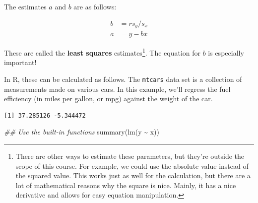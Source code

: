 \documentclass[
  letterpaper,
  DIV=11,
  numbers=noendperiod,
  oneside]{scrreprt}
\newenvironment{Shaded}{\begin{snugshade}}{\end{snugshade}}
\newcommand{\DocumentationTok}[1]{\textcolor[rgb]{0.37,0.37,0.37}{\textit{#1}}}
\newcommand{\FunctionTok}[1]{\textcolor[rgb]{0.28,0.35,0.67}{#1}}
\newcommand{\NormalTok}[1]{\textcolor[rgb]{0.00,0.23,0.31}{#1}}
\newcommand{\OtherTok}[1]{\textcolor[rgb]{0.00,0.23,0.31}{#1}}
\newcommand{\SpecialCharTok}[1]{\textcolor[rgb]{0.37,0.37,0.37}{#1}}
\begin{document}
The estimates \(a\) and \(b\) are as follows:

\begin{align*}
b &= rs_y/s_x\\
a &= \bar y - b\bar x
\end{align*}

These are called the \textbf{least squares} estimates\footnote{There are
  other ways to estimate these parameters, but they're outside the scope
  of this course. For example, we could use the absolute value instead
  of the squared value. This works just as well for the calculation, but
  there are a lot of mathematical reasons why the square is nice.
  Mainly, it has a nice derivative and allows for easy equation
  manipulation.}. The equation for \(b\) is especially important!

In R, these can be calculated as follows. The \texttt{mtcars} data set
is a collection of measurements made on various cars. In this example,
we'll regress the fuel efficiency (in miles per gallon, or mpg) against
the weight of the car.

\begin{Shaded}
\end{Shaded}

\begin{verbatim}
[1] 37.285126 -5.344472
\end{verbatim}

\begin{Shaded}
\begin{Highlighting}[]
\DocumentationTok{\#\# Use the built{-}in functions}
\FunctionTok{summary}\NormalTok{(}\FunctionTok{lm}\NormalTok{(y }\SpecialCharTok{\textasciitilde{}}\NormalTok{ x))}
\end{Highlighting}
\end{Shaded}
\end{document}
